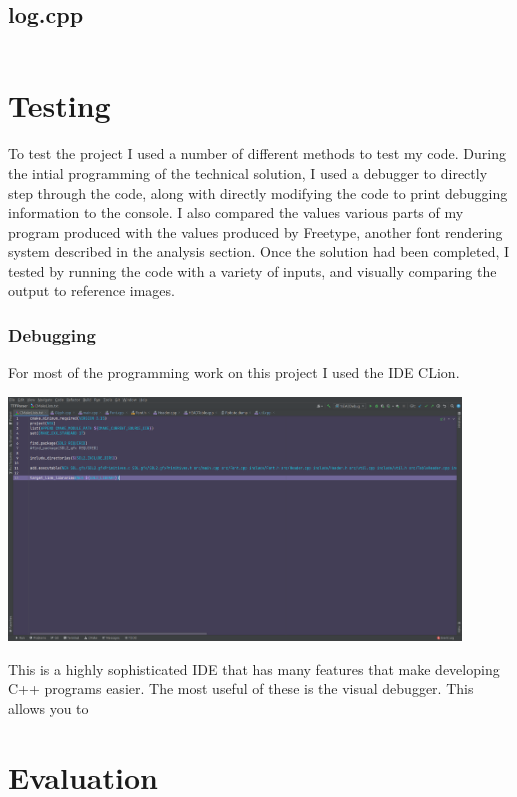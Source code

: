 \documentclass{report}
\begin{document}
\section{log.cpp}
\inputminted[linenos, frame=lines, framesep=2mm, breaklines,
tabsize=4]{cpp}{/home/jake/TTFParser/src/log.cpp}


\chapter{Testing}

To test the project I used a number of different methods to test my code. During
the intial programming of the technical solution, I used a debugger to directly
step through the code, along with directly modifying the code to print debugging
information to the console. I also compared the values various parts of my
program produced with the values produced by Freetype, another font rendering
system described in the analysis section. Once the solution had been completed,
I tested by running the code with a variety of inputs, and visually comparing
the output to reference images.

\subsection{Debugging}
For most of the programming work on this project I used the IDE CLion.
\begin{center}
  \includegraphics[width=12cm]{ide}
  \end{center}
This is a highly sophisticated IDE that has many features that make developing
C++ programs easier. The most useful of these is the visual debugger. This
allows you to 
\chapter{Evaluation}
\end{document}
